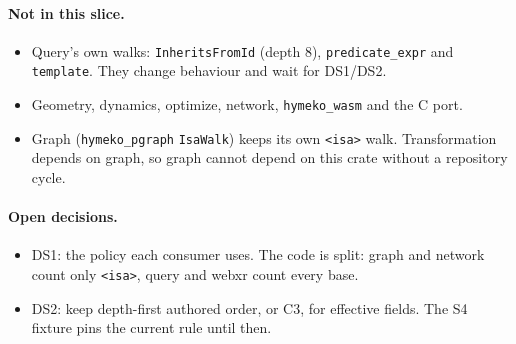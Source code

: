 \documentclass[11pt,a4paper]{article}
\newcommand{\code}[1]{\texttt{#1}}
\begin{document}
\paragraph{Not in this slice.}
\begin{itemize}[nosep]
\item Query's own walks: \code{InheritsFromId} (depth 8), \code{predicate\_expr} and
  \code{template}. They change behaviour and wait for DS1/DS2.
\item Geometry, dynamics, optimize, network, \code{hymeko\_wasm} and the C port.
\item Graph (\code{hymeko\_pgraph} \code{IsaWalk}) keeps its own \code{<isa>} walk.
  Transformation depends on graph, so graph cannot depend on this crate without a repository
  cycle.
\end{itemize}

\paragraph{Open decisions.}
\begin{itemize}[nosep]
\item DS1: the policy each consumer uses. The code is split: graph and network count only
  \code{<isa>}, query and webxr count every base.
\item DS2: keep depth-first authored order, or C3, for effective fields. The S4 fixture pins the
  current rule until then.
\end{itemize}
\end{document}

